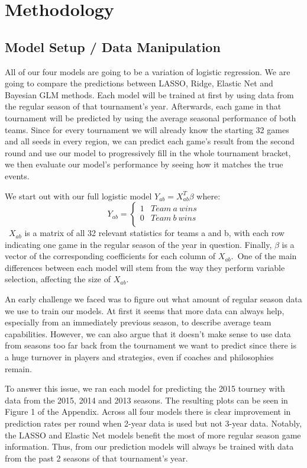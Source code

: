 \documentclass{article} %
\begin{document}
\section{Methodology}
\label{gen_inst}

\subsection{Model Setup / Data Manipulation}
All of our four models are going to be a variation of logistic regression. We are going to compare the predictions between LASSO, Ridge, Elastic Net and Bayesian GLM methods. Each model will be trained at first by using data from the regular season of that tournament's year. Afterwards, each game in that tournament will be predicted by using the average seasonal performance of both teams. Since for every tournament we will already know the starting 32 games and all seeds in every region, we can predict each game's result from the second round and use our model to progressively fill in the whole tournament bracket, we then evaluate our model's performance by seeing how it matches the true events.

We start out with our full logistic model $Y_{ab} = X_{ab}^T \beta$ where:\
\[ Y_{ab} = \left\{
\begin{array}{ll}
1 & Team \ a \ wins \\
0 &  Team \ b \ wins \\
\end{array} 
\right. \]\
$X_{ab}$ is a matrix of all 32 relevant statistics for teams a and b, with each row indicating one game in the regular season of the year in question. Finally, $\beta$ is a vector of the corresponding coefficients for each column of $X_{ab}$.\ One of the main differences between each model will stem from the way they perform variable selection, affecting the size of $X_{ab}$.

An early challenge we faced was to figure out what amount of regular season data we use to train our models. At first it seems that more data can always help, especially from an immediately previous season, to describe average team capabilities.  However, we can also argue that it doesn't make sense to use data from seasons too far back from the tournament we want to predict since there is a huge turnover in players and strategies, even if coaches and philosophies remain.

To answer this issue, we ran each model for predicting the 2015 tourney with data from the 2015, 2014 and 2013 seasons. The resulting plots can be seen in Figure 1 of the Appendix. Across all four models there is clear improvement in prediction rates per round when 2-year data is used but not 3-year data. Notably, the LASSO and Elastic Net models benefit the most of more regular season game information. Thus, from our prediction models will always be trained with data from the past 2 seasons of that tournament's year.
\end{document}
